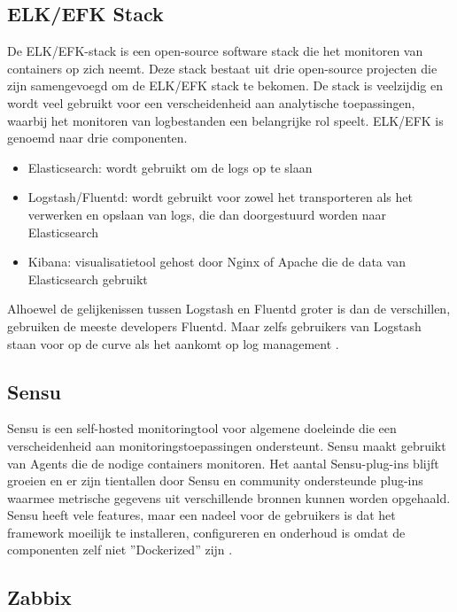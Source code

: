 \subsection{ELK/EFK Stack}

De ELK/EFK-stack is een open-source software stack die het monitoren van containers op zich neemt. Deze stack bestaat uit drie open-source projecten die zijn samengevoegd om de ELK/EFK stack te bekomen. De stack is veelzijdig en wordt veel gebruikt voor een verscheidenheid aan analytische toepassingen, waarbij het monitoren van logbestanden een belangrijke rol speelt. ELK/EFK is genoemd naar drie componenten.

\begin{itemize}
    \item Elasticsearch: wordt gebruikt om de logs op te slaan
    \item Logstash/Fluentd: wordt gebruikt voor zowel het transporteren als het verwerken en opslaan van logs, die dan doorgestuurd worden naar Elasticsearch
    \item Kibana: visualisatietool gehost door Nginx of Apache die de data van Elasticsearch gebruikt
\end{itemize}

Alhoewel de gelijkenissen tussen Logstash en Fluentd groter is dan de verschillen, gebruiken de meeste developers Fluentd. Maar zelfs gebruikers van Logstash staan voor op de curve als het aankomt op log management \autocite{Sissons2021}.

\subsection{Sensu}

Sensu is een self-hosted monitoringtool voor algemene doeleinde die een verscheidenheid aan monitoringstoepassingen ondersteunt. Sensu maakt gebruikt van Agents die de nodige containers monitoren. Het aantal Sensu-plug-ins blijft groeien en er zijn tientallen door Sensu en community ondersteunde plug-ins waarmee metrische gegevens uit verschillende bronnen kunnen worden opgehaald. Sensu heeft vele features, maar een nadeel voor de gebruikers is dat het framework moeilijk te installeren, configureren en onderhoud is omdat de componenten zelf niet ''Dockerized'' zijn \autocite{Sissons2021}. 

\subsection{Zabbix}

